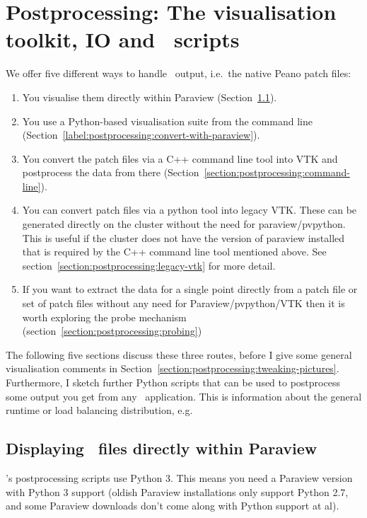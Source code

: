 \chapter{Postprocessing: The visualisation toolkit, IO and \Peano\
scripts}
\label{chapter:postprocessing}


We offer five different ways to handle \Peano\ output, i.e.~the native Peano
patch files:

\begin{enumerate}
  \item You visualise them directly within Paraview (Section~\ref{label:postprocessing:display-in-paraview}).
  \item You use a Python-based visualisation suite from the command line
  (Section~\ref{label:postprocessing:convert-with-paraview}).
  \item You convert the patch files via a C++ command line tool into VTK and
  postprocess the data from there
  (Section~\ref{section:postprocessing:command-line}).
  \item You can convert patch files via a python tool into legacy VTK. These can be generated directly on the cluster without the need for paraview/pvpython. This is useful if the cluster does not have the version of paraview installed that is required by the C++ command line tool mentioned above. See section~\ref{section:postprocessing:legacy-vtk} for more detail.
  \item If you want to extract the data for a single point directly from a patch file or set of patch files without any need for Paraview/pvpython/VTK then it is worth exploring the probe mechanism (section~\ref{section:postprocessing:probing})
\end{enumerate}


\noindent
The following five sections discuss these three routes, before I give some
general visualisation comments in
Section~\ref{section:postprocessing:tweaking-pictures}. 
Furthermore, I sketch further Python scripts that can be used to postprocess
some output you get from any \Peano\ application.
This is information about the general runtime or load balancing distribution,
e.g.


\section{Displaying \Peano\ files directly within Paraview}
\label{label:postprocessing:display-in-paraview}

\begin{remark}
  \Peano's postprocessing scripts use Python 3. This means you need a Paraview
  version with Python 3 support (oldish Paraview installations only support
  Python 2.7, and some Paraview downloads don't come along with Python support
  at al).
\end{remark}


